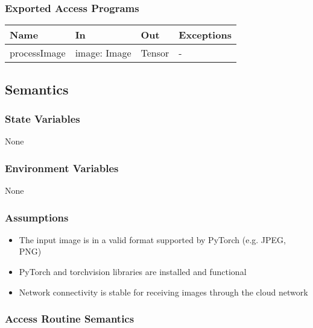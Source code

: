 \documentclass[12pt, titlepage]{article}
\begin{document}
\subsubsection{Exported Access Programs}

\begin{center}
\begin{tabular}{p{5cm} p{3cm} p{3cm} p{2cm}}
\hline
\textbf{Name} & \textbf{In} & \textbf{Out} & \textbf{Exceptions} \\
\hline
processImage & image: Image & Tensor & - \\
\hline
\end{tabular}
\end{center}

\subsection{Semantics}

\subsubsection{State Variables}
None



\subsubsection{Environment Variables}
None

\subsubsection{Assumptions}
\begin{itemize}
  \item The input image is in a valid format supported by PyTorch (e.g. JPEG, PNG)
  \item PyTorch and torchvision libraries are installed and functional
  \item Network connectivity is stable for receiving images through the cloud network
\end{itemize}


\subsubsection{Access Routine Semantics}
\end{document}
